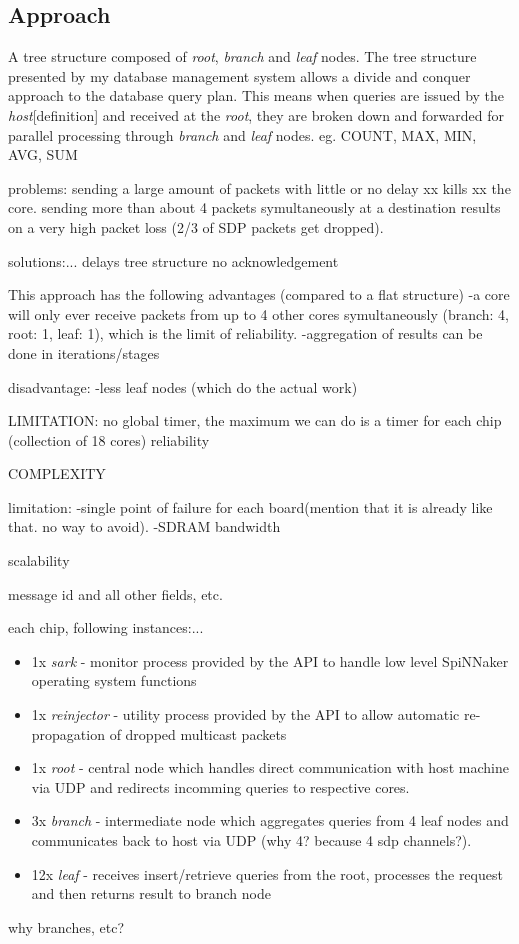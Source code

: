 \subsection{Approach}

A tree structure composed of \textit{root}, \textit{branch} and \textit{leaf} nodes. The tree structure presented by my database management system allows a divide and conquer approach to the database query plan. This means when queries are issued by the \textit{host}[definition] and received at the \textit{root}, they are broken down and forwarded for parallel processing through \textit{branch} and \textit{leaf} nodes. eg. COUNT, MAX, MIN, AVG, SUM

problems:
sending a large amount of packets with little or no delay xx kills xx the core. sending more than about 4 packets symultaneously at a destination results on a very high packet loss (2/3 of SDP packets get dropped).


solutions:...
delays
tree structure
no acknowledgement


This approach has the following advantages (compared to a flat structure)
-a core will only ever receive packets from up to 4 other cores symultaneously (branch: 4, root: 1, leaf: 1), which is the limit of reliability.
-aggregation of results can be done in iterations/stages

disadvantage:
-less leaf nodes (which do the actual work)

LIMITATION:
no global timer, the maximum we can do is a timer for each chip (collection of 18 cores)
reliability

COMPLEXITY

limitation:
-single point of failure for each board(mention that it is already like that. no way to avoid).
-SDRAM bandwidth

scalability

message id and all other fields, etc.

each chip, following instances:...

\begin{itemize}
\item 1x \textit{sark} - monitor process provided by the API to handle low level SpiNNaker operating system functions
\item 1x \textit{reinjector} - utility process provided by the API to allow automatic re-propagation of dropped multicast packets
\item 1x \textit{root} - central node which handles direct communication with host machine via UDP and redirects incomming queries to respective cores. 
\item 3x \textit{branch} - intermediate node which aggregates queries from 4 leaf nodes and communicates back to host via UDP (why 4? because 4 sdp channels?). 
\item 12x \textit{leaf} - receives insert/retrieve queries from the root, processes the request and then returns result to branch node
\end{itemize}
why branches, etc?

